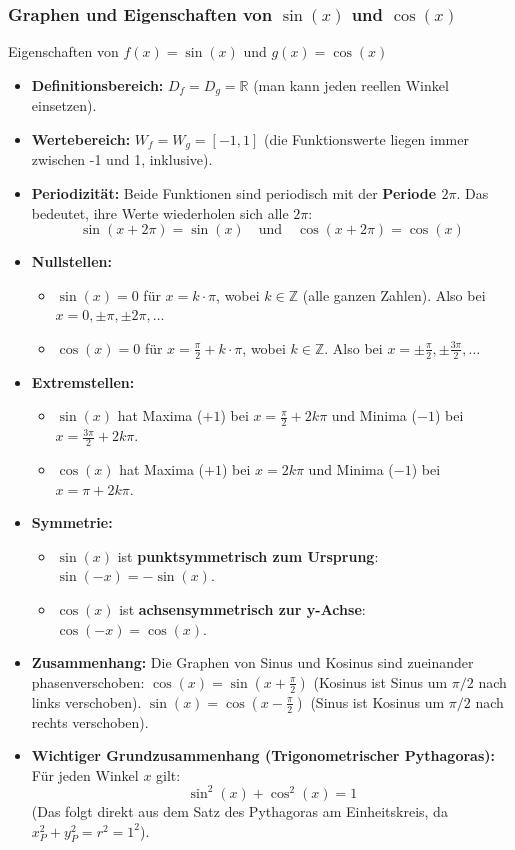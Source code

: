 \subsubsection{Graphen und Eigenschaften von $\sin(x)$ und $\cos(x)$}

\begin{merksatzumgebung}{Eigenschaften von $f(x)=\sin(x)$ und $g(x)=\cos(x)$}
\begin{itemize}
    \item \textbf{Definitionsbereich:} $D_f = D_g = \mathbb{R}$ (man kann jeden reellen Winkel einsetzen).
    \item \textbf{Wertebereich:} $W_f = W_g = [-1, 1]$ (die Funktionswerte liegen immer zwischen -1 und 1, inklusive).
    \item \textbf{Periodizität:} Beide Funktionen sind periodisch mit der \textbf{Periode $2\pi$}. Das bedeutet, ihre Werte wiederholen sich alle $2\pi$:
        \[ \sin(x + 2\pi) = \sin(x) \quad \text{und} \quad \cos(x + 2\pi) = \cos(x) \]
    \item \textbf{Nullstellen:}
        \begin{itemize}
            \item $\sin(x) = 0$ für $x = k \cdot \pi$, wobei $k \in \mathbb{Z}$ (alle ganzen Zahlen). Also bei $x=0, \pm\pi, \pm 2\pi, \dots$
            \item $\cos(x) = 0$ für $x = \frac{\pi}{2} + k \cdot \pi$, wobei $k \in \mathbb{Z}$. Also bei $x=\pm\frac{\pi}{2}, \pm\frac{3\pi}{2}, \dots$
        \end{itemize}
    \item \textbf{Extremstellen:}
        \begin{itemize}
            \item $\sin(x)$ hat Maxima ($+1$) bei $x = \frac{\pi}{2} + 2k\pi$ und Minima ($-1$) bei $x = \frac{3\pi}{2} + 2k\pi$.
            \item $\cos(x)$ hat Maxima ($+1$) bei $x = 2k\pi$ und Minima ($-1$) bei $x = \pi + 2k\pi$.
        \end{itemize}
    \item \textbf{Symmetrie:}
        \begin{itemize}
            \item $\sin(x)$ ist \textbf{punktsymmetrisch zum Ursprung}: $\sin(-x) = -\sin(x)$.
            \item $\cos(x)$ ist \textbf{achsensymmetrisch zur y-Achse}: $\cos(-x) = \cos(x)$.
        \end{itemize}
    \item \textbf{Zusammenhang:} Die Graphen von Sinus und Kosinus sind zueinander phasenverschoben:
        $\cos(x) = \sin(x + \frac{\pi}{2})$ (Kosinus ist Sinus um $\pi/2$ nach links verschoben).
        $\sin(x) = \cos(x - \frac{\pi}{2})$ (Sinus ist Kosinus um $\pi/2$ nach rechts verschoben).
    \item \textbf{Wichtiger Grundzusammenhang (Trigonometrischer Pythagoras):} Für jeden Winkel $x$ gilt:
        \[ \sin^2(x) + \cos^2(x) = 1 \]
        (Das folgt direkt aus dem Satz des Pythagoras am Einheitskreis, da $x_P^2+y_P^2=r^2=1^2$).
\end{itemize}
\end{merksatzumgebung}

